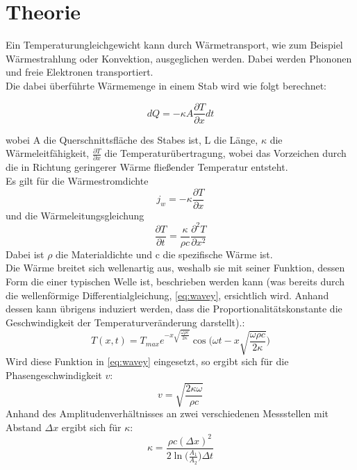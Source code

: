 \section{Theorie}
\label{sec:Theorie}

Ein Temperaturungleichgewicht kann durch Wärmetransport, wie zum Beispiel Wärmestrahlung oder Konvektion, ausgeglichen werden. Dabei werden Phononen und freie Elektronen transportiert.\\
Die dabei überführte Wärmemenge in einem Stab wird wie folgt berechnet:

\begin{equation}
    dQ = -\kappa A \frac{\partial T}{\partial x} dt
    \label{eq:warmcurrent}
\end{equation}

wobei A die Querschnittsfläche des Stabes ist, L die Länge, \(\kappa\) die Wärmeleitfähigkeit, \(\frac{\partial T}{\partial x}\) die Temperaturübertragung, wobei das Vorzeichen durch die in Richtung geringerer Wärme fließender Temperatur entsteht.\\
Es gilt für die Wärmestromdichte
\begin{equation}
    j_w = -\kappa\frac{\partial T}{\partial x}
    \label{eq:jw}
\end{equation}
und die Wärmeleitungsgleichung
\begin{equation}
    \frac{\partial T}{\partial t} = \frac{\kappa}{\rho c}\frac{\partial^2 T}{\partial x^2}
    \label{eq:wavey}
\end{equation}
Dabei ist \(\rho\) die Materialdichte und c die spezifische Wärme ist.\\
Die Wärme breitet sich wellenartig aus, weshalb sie mit seiner Funktion, dessen Form die einer typischen Welle ist, beschrieben werden kann (was bereits durch die wellenförmige Differentialgleichung, \autoref{eq:wavey}, ersichtlich wird. Anhand dessen kann übrigens induziert werden, dass die Proportionalitätskonstante die Geschwindigkeit der Temperaturveränderung darstellt).:
\begin{equation}
    T(x,t) = T_{max}e^{-x\sqrt{\frac{\omega \rho c}{2\kappa}}}\cos\biggl(\omega t-x\sqrt{\frac{\omega \rho c}{2\kappa}}\biggr) 
\end{equation}
Wird diese Funktion in \autoref{eq:wavey} eingesetzt, so ergibt sich für die Phasengeschwindigkeit \(v\):
\begin{equation}
    v = \sqrt{\frac{2\kappa \omega}{\rho c}}
\end{equation}
Anhand des Amplitudenverhältnisses an zwei verschiedenen Messstellen mit Abstand \(\Delta x\) ergibt sich für \(\kappa\):
\begin{equation}
    \kappa = \frac{\rho c (\Delta x)^2}{2\ln\biggl(\frac{A_1}{A_2}\biggr)\Delta t}
    \label{eq:warleit}
\end{equation}

